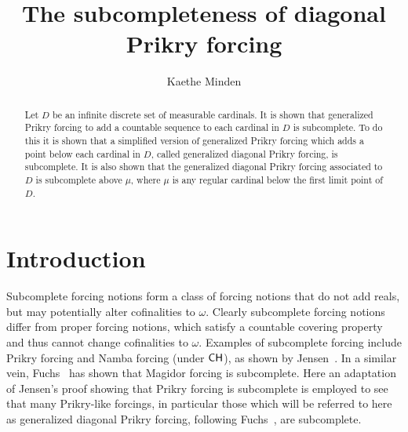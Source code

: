 \documentclass{amsart}
\theoremstyle{definition}
\theoremstyle{remark}
\newcommand{\CH}{\textup{\textsf{CH}}}
\begin{document}
\title{The subcompleteness of diagonal Prikry forcing}

\author{Kaethe Minden}
 \address[K.~Minden]{Mathematics, Marlboro College, 2582 South Road, Marlboro, VT 05344}
\date{}     					

\begin{abstract}
Let \(D\) be an infinite discrete set of measurable cardinals. It is shown that generalized Prikry forcing to add a countable sequence to each cardinal in \(D\) is subcomplete. To do this it is shown that a simplified version of generalized Prikry forcing which adds a point below each cardinal in \(D\), called generalized diagonal Prikry forcing, is subcomplete. It is also shown that the generalized diagonal Prikry forcing associated to \(D\) is subcomplete above $\mu$, where $\mu$ is any regular cardinal below the first limit point of \(D\).
\end{abstract}
\maketitle

\section{Introduction}
Subcomplete forcing notions form a class of forcing notions that do not add reals, but may potentially alter cofinalities to $\omega$. 
Clearly subcomplete forcing notions differ from proper forcing notions, which satisfy a countable covering property and thus cannot change cofinalities to $\omega$. 
Examples of subcomplete forcing include Prikry forcing and Namba forcing (under $\CH$), as shown by Jensen~\cite[Section 3.3]{Jensen:2012fr}. 
In a similar vein, Fuchs~\cite{Fuchs:2017Magidor} has shown that Magidor forcing is subcomplete. Here an adaptation of Jensen's proof showing that Prikry forcing is subcomplete is employed to see that many Prikry-like forcings, in particular those which will be referred to here as generalized diagonal Prikry forcing, following Fuchs~\cite{Fuchs:2005kx}, are subcomplete.
\end{document}
